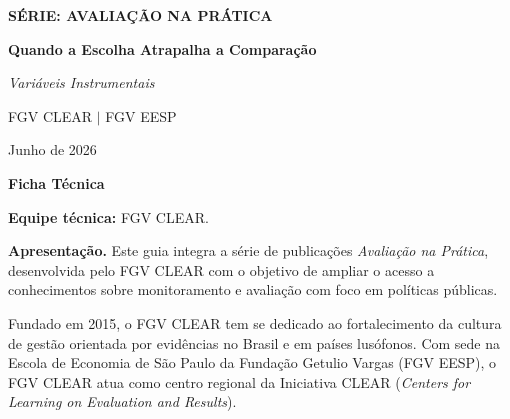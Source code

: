 \documentclass[12pt, a4paper, openany]{book}
\numberwithin{equation}{chapter}
\numberwithin{table}{chapter}
\numberwithin{figure}{chapter}
\begin{document}

\frontmatter

\thispagestyle{empty}
\begin{center}
\vspace*{3cm}

{\Large\bfseries\color{clearlightblue} S\'ERIE: AVALIA\c{C}\~AO NA PR\'ATICA}

\vspace{1.8cm}

{\Huge\bfseries\color{clearblue} Quando a Escolha Atrapalha a Comparação}

\vspace{0.6cm}

{\Large\color{clearblue}\textit{Variáveis Instrumentais}}

\vspace{2.2cm}

{\large FGV CLEAR $|$ FGV EESP}

\vspace{0.5cm}

{\large Junho de 2026}

\vfill
\end{center}
\newpage

\thispagestyle{empty}
\vspace*{1.5cm}

{\Large\bfseries\color{clearblue} Ficha T\'ecnica}

\bigskip

\noindent\textbf{Equipe t\'ecnica:} FGV CLEAR.

\bigskip

\noindent\textbf{Apresenta\c{c}\~ao.} Este guia integra a s\'erie de publica\c{c}\~oes \textit{Avalia\c{c}\~ao na Pr\'atica}, desenvolvida pelo FGV CLEAR com o objetivo de ampliar o acesso a conhecimentos sobre monitoramento e avalia\c{c}\~ao com foco em pol\'iticas p\'ublicas.

\medskip

\noindent Fundado em 2015, o FGV CLEAR tem se dedicado ao fortalecimento da cultura de gest\~ao orientada por evid\^encias no Brasil e em pa\'ises lus\'ofonos. Com sede na Escola de Economia de S\~ao Paulo da Funda\c{c}\~ao Getulio Vargas (FGV EESP), o FGV CLEAR atua como centro regional da Iniciativa CLEAR (\textit{Centers for Learning on Evaluation and Results}).
\end{document}
